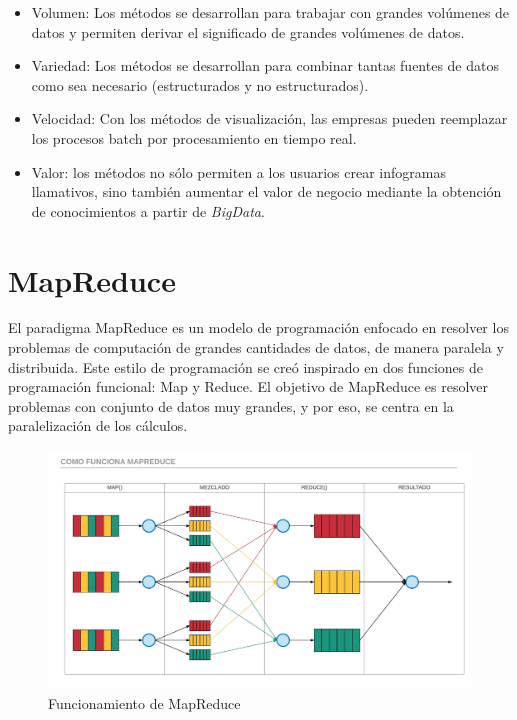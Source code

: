 \begin{itemize}
	\item Volumen: Los métodos se desarrollan para trabajar con grandes volúmenes de datos y permiten derivar el significado de grandes volúmenes de datos.
	\item Variedad: Los métodos se desarrollan para combinar tantas fuentes de datos como sea necesario (estructurados y no estructurados).
	\item Velocidad: Con los métodos de visualización, las empresas pueden reemplazar los procesos batch por procesamiento en tiempo real.
	\item Valor: los métodos no sólo permiten a los usuarios crear infogramas llamativos, sino también aumentar el valor de negocio mediante la obtención de conocimientos a partir de \textit{BigData}.
\end{itemize}

\section{MapReduce}

El paradigma MapReduce es un modelo de programación enfocado en resolver los problemas de computación de grandes cantidades de datos, de manera paralela y distribuida. Este estilo de programación se creó inspirado en dos funciones de programación funcional: Map y Reduce. El objetivo de MapReduce es resolver problemas con conjunto de datos muy grandes, y por eso, se centra en la paralelización de los cálculos. 

\begin{figure}
	\centering
	\includegraphics[width=1\linewidth]{imagenes/Como_funciona_MapReduce}
	\caption{Funcionamiento de MapReduce}
	\label{fig:comofuncionamapreduce}
\end{figure}

